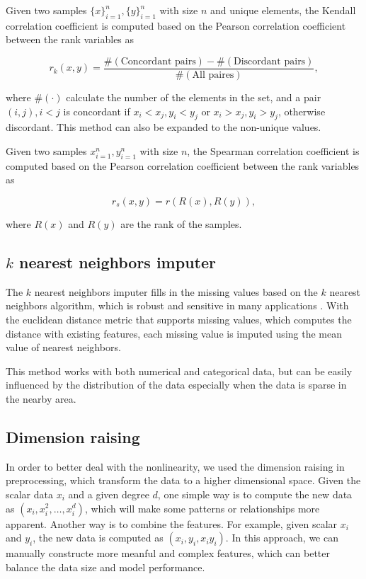 \documentclass[11pt]{article}
\begin{document}
Given two samples $\{x\}_{i=1}^n, \{y\}_{i=1}^n$ with size $n$ and unique elements, the Kendall correlation coefficient is computed based on the Pearson correlation coefficient between the rank variables as

$$
  r_k (x, y) = \frac{\#(\text{Concordant pairs}) - \#(\text{Discordant pairs})}{\#(\text{All paires})},
$$

\noindent where $\#(\cdot)$ calculate the number of the elements in the set, and a pair $(i, j), i < j$ is concordant if $x_i < x_j, y_i < y_j$ or $x_i > x_j, y_i > y_j$, otherwise discordant. This method can also be expanded to the non-unique values.

Given two samples ${x}_{i=1}^n, {y}_{i=1}^n$ with size $n$, the Spearman correlation coefficient is computed based on the Pearson correlation coefficient between the rank variables as

$$
  r_s (x, y) = r(R(x), R(y)),
$$

\noindent where $R(x)$ and $R(y)$ are the rank of the samples.

\subsection{$k$ nearest neighbors imputer}

The $k$ nearest neighbors imputer fills in the missing values based on the $k$ nearest neighbors algorithm, which is  robust and sensitive in many applications \cite{troyanskaya2001missing} \cite{juna2022water}. With the euclidean distance metric that supports missing values, which computes the distance with existing features, each missing value is imputed using the mean value of nearest neighbors.

This method works with both numerical and categorical data, but can be easily influenced by the distribution of the data especially when the data is sparse in the nearby area.

\subsection{Dimension raising}

In order to better deal with the nonlinearity, we used the dimension raising in preprocessing, which transform the data to a higher dimensional space. Given the scalar data $x_i$ and a given degree $d$, one simple way is to compute the new data as $(x_i, x_i^2, \dots, x_i^d)$, which will make some patterns or relationships more apparent. Another way is to combine the features. For example, given scalar $x_i$ and $y_i$, the new data is computed as $(x_i, y_i, x_i y_i)$. In this approach, we can manually constructe more meanful and complex features, which can better balance the data size and model performance.
\end{document}
